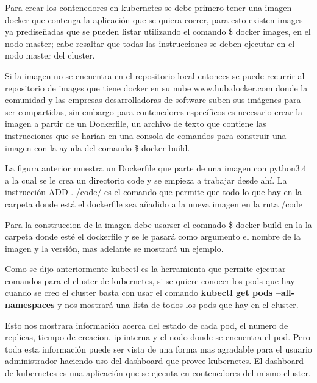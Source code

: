      Para crear los contenedores en kubernetes se debe primero tener una imagen docker que contenga la aplicación que se quiera correr, para esto existen images ya prediseñadas que se pueden listar utilizando el comando \$ docker images, en el nodo master; cabe resaltar que todas las instrucciones se deben ejecutar en el nodo master del cluster. 
     
     
     
     
     Si la imagen no se encuentra en el repositorio local entonces se puede recurrir al repositorio de images que tiene docker en su nube www.hub.docker.com donde la comunidad y las empresas desarrolladoras de software suben sus imágenes para ser compartidas, sin embargo para contenedores específicos es necesario crear la imagen a partir de un Dockerfile, un archivo de texto que contiene las instrucciones que se harían en una consola de comandos para construir una imagen con la ayuda del comando \$ docker build.
     
     
    
      
      
      La figura anterior muestra un Dockerfile que parte de una imagen con python3.4
      a la cual se le crea un directorio code y se empieza a trabajar desde ahí.
      La instrucción ADD . /code/ es el comando que permite que todo lo que hay en la carpeta donde está el dockerfile sea añadido a la nueva imagen en la ruta /code
      
      Para la construccion de la imagen debe usarser el comnado \$ docker build en la la carpeta donde esté el dockerfile y se le pasará como argumento el nombre de la imagen y la versión, mas adelante se mostrará un ejemplo.
      
      Como se dijo anteriormente kubectl es la herramienta que permite ejecutar comandos para el cluster de kubernetes, si se quiere conocer los pods que hay cuando se creo el cluster basta con usar el comando \textbf{kubectl get pods --all-namespaces} y nos mostrará una lista de todos los pods que hay en el cluster.
      
      
      
      Esto nos mostrara información acerca del estado de cada pod, el numero de replicas, tiempo de creacion, ip interna y el nodo donde se encuentra el pod. Pero toda esta información puede ser vista de una forma mas agradable para el usuario administrador haciendo uso del dashboard que provee kubernetes. El dashboard de kubernetes es una aplicación que se ejecuta en contenedores del mismo cluster.
      

